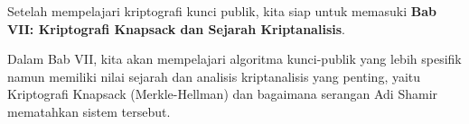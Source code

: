 \documentclass[main.tex]{subfiles}
\begin{document}

\begin{transition}
Setelah mempelajari kriptografi kunci publik, kita siap untuk memasuki \textbf{Bab VII: Kriptografi Knapsack dan Sejarah Kriptanalisis}.

Dalam Bab VII, kita akan mempelajari algoritma kunci-publik yang lebih spesifik namun memiliki nilai sejarah dan analisis kriptanalisis yang penting, yaitu Kriptografi Knapsack (Merkle-Hellman) dan bagaimana serangan Adi Shamir mematahkan sistem tersebut.
\end{transition}

\ifSubfilesClassLoaded{
  \renewcommand{\bibname}{Daftar Pustaka}
  
  
}{}
\end{document}
